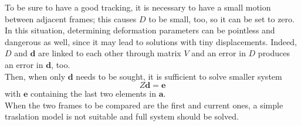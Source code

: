 \documentclass[a4paper, onecolumn]{report}
\begin{document}
To be sure to have a good tracking, it is necessary to have a small motion between adjacent frames; this causes $D$ to be small, too, so it can be set to zero. In this situation, determining deformation parameters can be pointless and dangerous as well, since it may lead to solutions with tiny displacements. Indeed, $D$ and $\boldsymbol{d}$ are linked to each other through matrix $V$ and an error in $D$ produces an error in $\boldsymbol{d}$, too. \\
Then, when only $\boldsymbol{d}$ needs to be sought, it is sufficient to solve smaller system
\begin{equation}
	Z\boldsymbol{d} = \boldsymbol{e}
\end{equation}
with $\boldsymbol{e}$ containing the last two elements in $\boldsymbol{a}$. \\
When the two frames to be compared are the first and current ones, a simple traslation model is not suitable and full system should be solved. 
\end{document}
